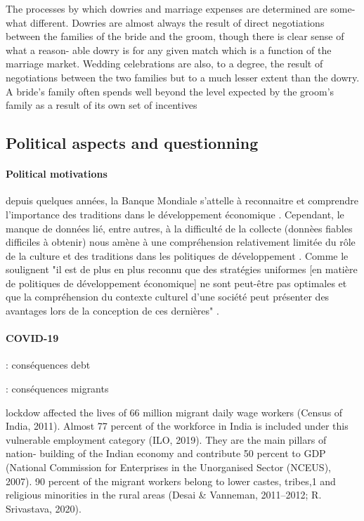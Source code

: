 \documentclass[a4paper, 11pt, onecolumn]{article}
\begin{document}
The processes by which dowries and marriage expenses are determined are some-
what different. Dowries are almost always the result of direct negotiations between
the families of the bride and the groom, though there is clear sense of what a reason-
able dowry is for any given match which is a function of the marriage market.
Wedding celebrations are also, to a degree, the result of negotiations between the
two families but to a much lesser extent than the dowry. A bride's family often spends
well beyond the level expected by the groom's family as a result of its own set of
incentives







	\subsection{Political aspects and questionning}

\paragraph{Political motivations}
depuis quelques années, la Banque Mondiale s'attelle à reconnaitre et comprendre l'importance des traditions dans le développement économique \citep{Banque2015, Collier2017}. Cependant, le manque de données lié, entre autres, à la difficulté de la collecte (donnèes fiables difficiles à obtenir) nous amène à une compréhension relativement limitée du rôle de la culture et des traditions dans les politiques de développement \citep{Ashraf2018}. Comme le soulignent \cite{Ashraf2018} "il est de plus en plus reconnu que des stratégies uniformes [en matière de politiques de développement économique] ne sont peut-être pas optimales et que la compréhension du contexte culturel d'une société peut présenter des avantages lors de la conception de ces dernières" \citep{Rao2004, Banque2015}.



\paragraph{COVID-19}

\cite{Guerin2020} : conséquences debt

\cite{Shahare2021} : conséquences migrants 

lockdow affected the lives of 66 million migrant daily wage workers
(Census of India, 2011). Almost 77 percent of the workforce in India is included under
this vulnerable employment category (ILO, 2019). They are the main pillars of nation-
building of the Indian economy and contribute 50 percent to GDP (National
Commission for Enterprises in the Unorganised Sector (NCEUS), 2007). 
90 percent of the migrant workers belong to lower castes,
tribes,1 and religious minorities in the rural areas (Desai \& Vanneman, 2011–2012;
R. Srivastava, 2020).
\end{document}
